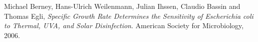 

\begin{thebibliography}{9}

  Michael Berney, Hans-Ulrich Weilenmann, Julian Ihssen, Claudio Bassin and Thomas Egli,
  \emph{Specific Growth Rate Determines the Sensitivity of Escherichia coli to Thermal, UVA, and Solar Disinfection}.
  American Society for Microbiology, 
  2006.

\end{thebibliography}
